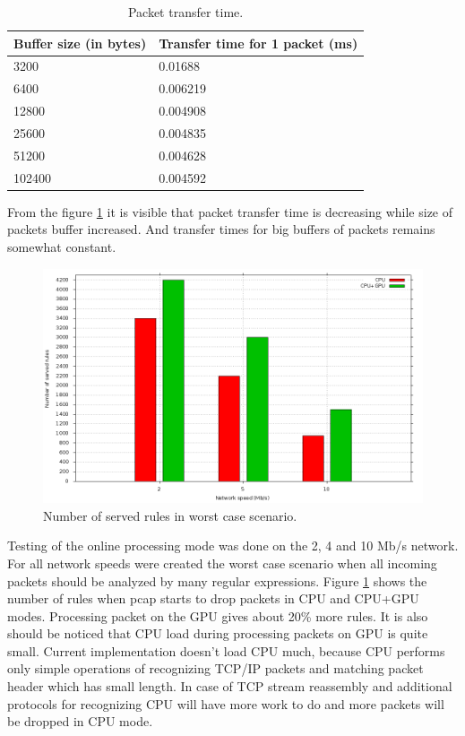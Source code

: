 \documentclass[thesis=M,english]{FITthesis}[2011/07/15]
\begin{document}
\begin{table}[h]
\centering
\begin{tabular}{| l | l |}
\hline
Buffer size (in bytes) & Transfer time for 1 packet (ms) \\ \hline
3200 & 0.01688 \\ \hline
6400 & 0.006219 \\ \hline
12800 & 0.004908 \\ \hline
25600 & 0.004835 \\ \hline
51200 & 0.004628 \\ \hline
102400 & 0.004592 \\ \hline
\end{tabular}
\caption{Packet transfer time.}
\label{fig:packet_transfer_times}
\end{table}

From the figure \ref{fig:packet_transfer_times} it is visible that packet transfer time is decreasing while size of packets buffer increased. And transfer times for big buffers of packets remains somewhat constant.

\begin{figure}[h]
\centering
\includegraphics[scale=0.3]{images/graph1.png}
\caption{Number of served rules in worst case scenario.}
\label{fig:graph1}
\end{figure}

Testing of the online processing mode was done on the 2, 4 and 10 Mb/s network. For all network speeds were created the worst case scenario when all incoming packets should be analyzed by many regular expressions. Figure \ref{fig:graph1} shows the number of rules when pcap starts to drop packets in CPU and CPU+GPU modes. Processing packet on the GPU gives about 20\% more rules. It is also should be noticed that CPU load during processing packets on GPU is quite small. Current implementation doesn't load CPU much, because CPU performs only simple operations of recognizing TCP/IP packets and matching packet header which has small length. In case of TCP stream reassembly and additional protocols for recognizing CPU will have more work to do and more packets will be dropped in CPU mode.
\end{document}
